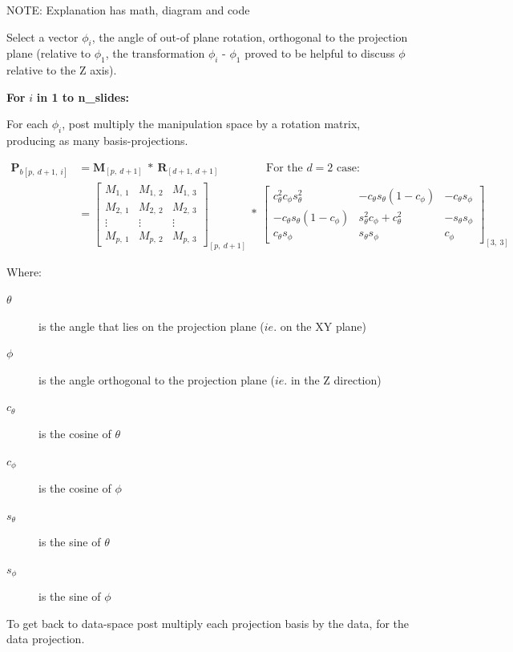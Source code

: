 \documentclass{monashthesis}
\begin{document}
NOTE: Explanation has math, diagram and code

Select a vector \(\phi_i\), the angle of out-of plane rotation,
orthogonal to the projection plane (relative to \(\phi_1\), the
transformation \(\phi_i\) - \(\phi_1\) proved to be helpful to discuss
\(\phi\) relative to the Z axis).

\textbf{For } \(i\) \textbf{in 1 to n\_slides:}

For each \(\phi_i\), post multiply the manipulation space by a rotation
matrix, producing as many basis-projections.

\begin{align*}
  \textbf{P}_{b[p,~d+1,~i]}
  &= \textbf{M}_{[p,~d+1]} ~*~ \textbf{R}_{[d+1,~d+1]} 
    ~~~~~~~~~~~~~~~~~~~\text{For the $d=2$ case:} \\
  &= \begin{bmatrix}
    M_{1,~1} & M_{1,~2} & M_{1,~3} \\
    M_{2,~1} & M_{2,~2} & M_{2,~3} \\
    \vdots   & \vdots   & \vdots   \\
    M_{p,~1} & M_{p,~2} & M_{p,~3}
  \end{bmatrix}_{[p,~d+1]}
    ~*~
  \begin{bmatrix}
    c_\theta^2 c_\phi s_\theta^2 &
    -c_\theta s_\theta (1 - c_\phi) &
    -c_\theta s_\phi \\
    -c_\theta s_\theta (1 - c_\phi) &
    s_\theta^2 c_\phi + c_\theta^2 &
    -s_\theta s_\phi \\
    c_\theta s_\phi &
    s_\theta s_\phi &
    c_\phi
  \end{bmatrix}_{[3,~3]}
\end{align*}

Where:

\begin{description}
  \item[$\theta$] is the angle that lies on the projection plane ($ie.$ on the XY plane)
  \item[$\phi$] is the angle orthogonal to the projection plane ($ie.$ in the Z direction)
  \item[$c_\theta$] is the cosine of $\theta$
  \item[$c_\phi$]   is the cosine of $\phi$
  \item[$s_\theta$] is the sine of   $\theta$
  \item[$s_\phi$]   is the sine of   $\phi$
\end{description}

To get back to data-space post multiply each projection basis by the
data, for the data projection.
\end{document}
